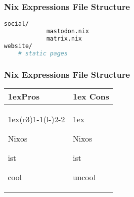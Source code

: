 \documentclass{beamer}
\begin{document}
\begin{frame}[fragile]
\frametitle{Nix Expressions File Structure}

\begin{lstlisting}[language=bash]
		social/
			mastodon.nix
			matrix.nix
website/
	# static pages

\end{lstlisting}

\end{frame}


\begin{frame}[fragile]
\frametitle{Nix Expressions File Structure}
\begin{table}
\begin{tabularx}{\linewidth}{>{\parskip1ex}X@{\kern4\tabcolsep}>{\parskip1ex}X}
\toprule
\hfil\bfseries Pros
&
\hfil\bfseries Cons
\\\cmidrule(r{3\tabcolsep}){1-1}\cmidrule(l{-\tabcolsep}){2-2}

Nixos\par
ist\par
cool
&

Nixos\par
ist\par
uncool

\\\bottomrule
\end{tabularx}
\end{table}
\end{frame}
\end{document}
